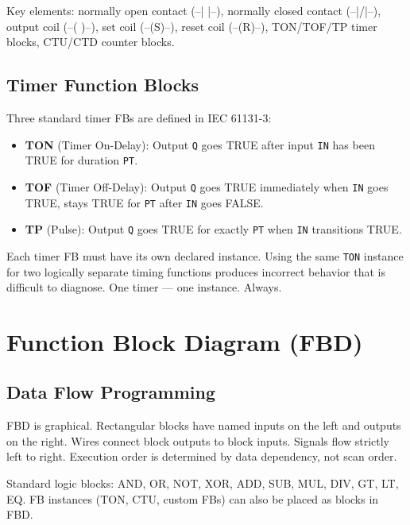 \documentclass[12pt,twoside,openright]{memoir}
\begin{document}
Key elements: normally open contact (--| |--), normally closed contact (--|/|--), output coil (--( )--), set coil (--(S)--), reset coil (--(R)--), TON/TOF/TP timer blocks, CTU/CTD counter blocks.

\section{Timer Function Blocks}

Three standard timer FBs are defined in IEC 61131-3:

\begin{itemize}
  \item \textbf{TON} (Timer On-Delay): Output \texttt{Q} goes TRUE after input \texttt{IN} has been TRUE for duration \texttt{PT}.
  \item \textbf{TOF} (Timer Off-Delay): Output \texttt{Q} goes TRUE immediately when \texttt{IN} goes TRUE, stays TRUE for \texttt{PT} after \texttt{IN} goes FALSE.
  \item \textbf{TP} (Pulse): Output \texttt{Q} goes TRUE for exactly \texttt{PT} when \texttt{IN} transitions TRUE.
\end{itemize}

\begin{fieldgotcha}
Each timer FB must have its own declared instance. Using the same \texttt{TON} instance for two logically separate timing functions produces incorrect behavior that is difficult to diagnose. One timer --- one instance. Always.
\end{fieldgotcha}

\chapter{Function Block Diagram (FBD)}

\section{Data Flow Programming}

FBD is graphical. Rectangular blocks have named inputs on the left and outputs on the right. Wires connect block outputs to block inputs. Signals flow strictly left to right. Execution order is determined by data dependency, not scan order.

Standard logic blocks: AND, OR, NOT, XOR, ADD, SUB, MUL, DIV, GT, LT, EQ. FB instances (TON, CTU, custom FBs) can also be placed as blocks in FBD.
\end{document}
